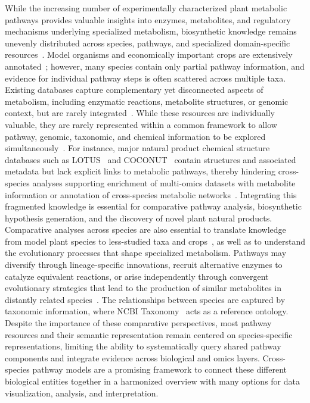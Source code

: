 \documentclass[11pt,a4paper]{article}
\begin{document}
While the increasing number of experimentally characterized plant metabolic pathways provides
valuable insights into enzymes, metabolites, and regulatory mechanisms underlying specialized
metabolism, biosynthetic knowledge remains unevenly distributed across species, pathways, and
specialized domain-specific resources~\cite{moghe2018}. Model organisms and economically important crops are
extensively annotated~\cite{xue2023status}; however, many species contain only partial pathway information, and evidence
for individual pathway steps is often scattered across multiple taxa. Existing databases capture
complementary yet disconnected aspects of metabolism, including enzymatic reactions, metabolite
structures, or genomic context, but are rarely integrated~\cite{mcconnachie2025}. While these resources are individually
valuable, they are rarely represented within a common framework to allow pathway, genomic, taxonomic,
and chemical information to be explored simultaneously~\cite{mcconnachie2025}. For instance, major natural product chemical
structure databases such as LOTUS~\cite{rutz2022} and COCONUT~\cite{sorokina2021} contain structures
and associated metadata but lack explicit links to metabolic pathways, thereby hindering
cross-species analyses supporting enrichment of multi-omics datasets with metabolite information or
annotation of cross-species metabolic networks~\cite{mildau2025,singh2022}. Integrating this
fragmented knowledge is essential for comparative pathway analysis, biosynthetic hypothesis
generation, and the discovery of novel plant natural products. Comparative analyses across species
are also essential to translate knowledge from model plant species to less-studied taxa and
crops~\cite{uauy2025}, as well as to understand the evolutionary processes that shape specialized
metabolism. Pathways may diversify through lineage-specific innovations, recruit alternative enzymes
to catalyze equivalent reactions, or arise independently through convergent evolutionary strategies
that lead to the production of similar metabolites in distantly related species~\cite{scossa2026}. The
relationships between species are captured by taxonomic information, where NCBI
Taxonomy~\cite{schoch2020} acts as a reference ontology. Despite the importance of these comparative
perspectives, most pathway resources and their semantic representation remain centered on
species-specific representations, limiting the ability to systematically query shared pathway
components and integrate evidence across biological and omics layers. Cross-species pathway models
are a promising framework to connect these different biological entities together in a harmonized
overview with many options for data visualization, analysis, and interpretation.
\end{document}
